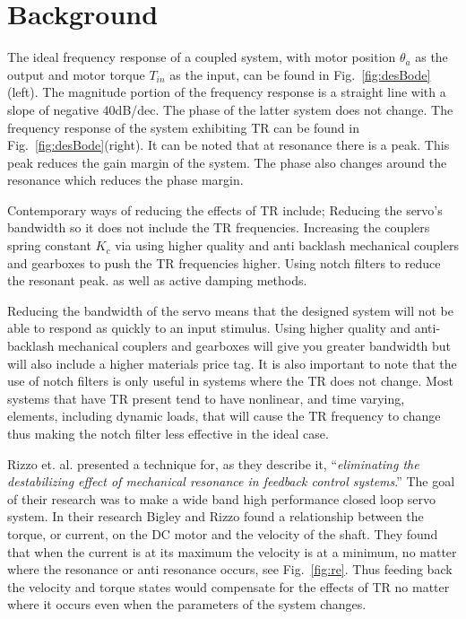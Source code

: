 \section{Background}\label{sec:back}
The ideal frequency response of a coupled system, with motor position $\theta_a$ as the output and motor torque $T_{in}$ as the input, can be found in Fig.~\ref{fig:desBode}(left). The magnitude portion of the frequency response is a straight line with a slope of negative 40dB/dec. The phase of the latter system does not change. The frequency response of the system exhibiting TR can be found in Fig.~\ref{fig:desBode}(right). It can be noted that at resonance there is a peak. This peak reduces the gain margin of the system. The phase also changes around the resonance which reduces the phase margin.

Contemporary ways of reducing the effects of TR include; Reducing the servo's bandwidth so it does not include the TR frequencies. Increasing the couplers spring constant $K_c$ via using higher quality and anti backlash mechanical couplers and gearboxes to push the TR frequencies higher. Using notch filters to reduce the resonant peak. as well as active damping methods\cite{5730488}.   

Reducing the bandwidth of the servo means that the designed system will not be able to respond as quickly to an input stimulus. Using higher quality and anti-backlash mechanical couplers and gearboxes will give you greater bandwidth but will also include a higher materials price tag. It is also important to note that the use of notch filters is only useful in systems where the TR does not change. Most systems that have TR present tend to have nonlinear, and time varying, elements, including dynamic loads, that will cause the TR frequency to change thus making the notch filter less effective in the ideal case.  

Rizzo et. al.\cite{bigley1978resonance} presented a technique for, as they describe it, ``\textit{eliminating the destabilizing effect of mechanical resonance in feedback control systems}.''  The goal of their research was to make a wide band high performance closed loop servo system. In their research Bigley and Rizzo found a relationship between the torque, or current, on the DC motor and the velocity of the shaft. They found that when the current is at its maximum the velocity is at a minimum, no matter where the resonance or anti resonance occurs, see Fig.~\ref{fig:re}. Thus feeding back the velocity and torque states would compensate for the effects of TR no matter where it occurs even when the parameters of the system changes.

